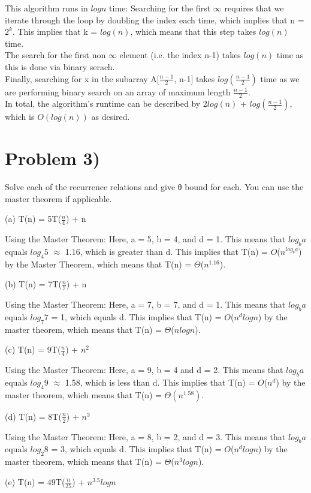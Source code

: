 \documentclass{article}
\begin{document}
This algorithm runs in $log n$ time: 
Searching for the first $\infty$ requires that we iterate through the loop by doubling the index each time, which implies that n = $2^k$. This implies that k = $log(n)$, which means that this step takes $log(n)$ time. \\
The search for the first non $\infty$ element (i.e. the index n-1) takes  $log(n)$ time as this is done via binary serach. \\
Finally, searching for x in the subarray A[$\frac{n-1}{2}$, n-1] takes $log(\frac{n-1}{2})$ time as we are performing binary search on an array of maximum length $\frac{n-1}{2}$. \\
In total, the algorithm's runtime can be described by 2$log(n)$ + $log(\frac{n-1}{2})$, which is $O(log(n))$ as desired.
\section*{Problem 3)}  Solve each of the recurrence relations and give θ bound for each. You can use the master theorem if applicable.

(a) T(n) = 5T($\frac{n}{4}$) + n

Using the Master Theorem:
Here, a = 5, b = 4, and d = 1. This means that $log_b a$ equals $log_4 5$ $\approx$ 1.16, which is greater than d. This implies that T(n) = $O$($n^{log_b a}$) by the Master Theorem, which means that T(n) = $\Theta$($n^{1.16}$).

(b) T(n) = 7T($\frac{n}{7}$) + n

Using the Master Theorem:
Here, a = 7, b = 7, and d = 1. This means that $log_b a$ equals $log_7 7$ = 1, which equals d. This implies that T(n) = $O$($n^dlogn$) by the master theorem, which means that T(n) = $\Theta$($nlogn$).

(c) T(n) = 9T($\frac{n}{4}$) + $n^2$

Using the Master Theorem:
Here, a = 9, b = 4 and d = 2. This means that $log_b a$ equals $log_4 9$ $\approx$ 1.58, which is less than d. This implies that T(n) = $O$($n^d$) by the master theorem, which means that T(n) = $\Theta(n^{1.58})$.

(d) T(n) = 8T($\frac{n}{2}$) + $n^3$

Using the Master Theorem:
Here, a = 8, b = 2, and d = 3. This means that $log_b a$ equals $log_2 8$ = 3, which equals d. This implies that T(n) = $O$($n^dlogn$) by the master theorem, which means that T(n) = $\Theta$($n^{3}logn$).

(e) T(n) = 49T($\frac{n}{25}$) + $n^{3.5}log n$
\end{document}
